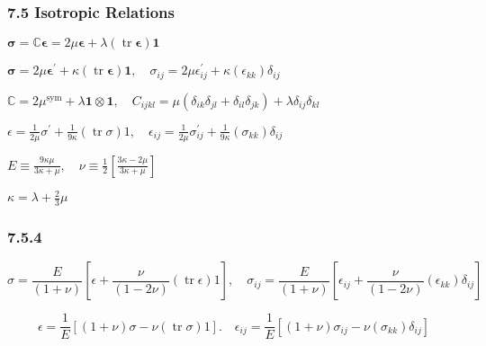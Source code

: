 \hypertarget{isotropic-relations}{%
\subsubsection{7.5 Isotropic Relations}\label{isotropic-relations}}

\(\boldsymbol{\sigma}=\mathbb{C} \boldsymbol{\epsilon}=2 \mu \boldsymbol{\epsilon}+\lambda(\operatorname{tr} \boldsymbol{\epsilon}) \mathbf{1}\)

\(\boldsymbol{\sigma}=2 \mu \boldsymbol{\epsilon}^{\prime}+\kappa(\operatorname{tr} \boldsymbol{\epsilon}) \mathbf{1}, \quad \sigma_{i j}=2 \mu \epsilon_{i j}^{\prime}+\kappa\left(\epsilon_{k k}\right) \delta_{i j}\)

\(\mathbb{C}=2 \mu^{\mathrm{sym}}+\lambda \mathbf{1} \otimes \mathbf{1}, \quad C_{i j k l}=\mu\left(\delta_{i k} \delta_{j l}+\delta_{i l} \delta_{j k}\right)+\lambda \delta_{i j} \delta_{k l}\)

\(\epsilon=\frac{1}{2 \mu} \sigma^{\prime}+\frac{1}{9 \kappa}(\operatorname{tr} \sigma) 1, \quad \epsilon_{i j}=\frac{1}{2 \mu} \sigma_{i j}^{\prime}+\frac{1}{9 \kappa}\left(\sigma_{k k}\right) \delta_{i j}\)

\(E \equiv \frac{9 \kappa \mu}{3 \kappa+\mu}, \quad \nu \equiv \frac{1}{2}\left[\frac{3 \kappa-2 \mu}{3 \kappa+\mu}\right]\)

\(\kappa=\lambda+\frac{2}{3} \mu\)

\hypertarget{section}{%
\subsubsection{7.5.4}\label{section}}

\[
\sigma=\frac{E}{(1+\nu)}\left[\epsilon+\frac{\nu}{(1-2 \nu)}(\operatorname{tr} \epsilon) 1\right], \quad \sigma_{i j}=\frac{E}{(1+\nu)}\left[\epsilon_{i j}+\frac{\nu}{(1-2 \nu)}\left(\epsilon_{k k}\right) \delta_{i j}\right]
\]

\[
\epsilon=\frac{1}{E}[(1+\nu) \sigma-\nu(\operatorname{tr} \sigma) 1] . \quad \epsilon_{i j}=\frac{1}{E}\left[(1+\nu) \sigma_{i j}-\nu\left(\sigma_{k k}\right) \delta_{i j}\right]
\]

